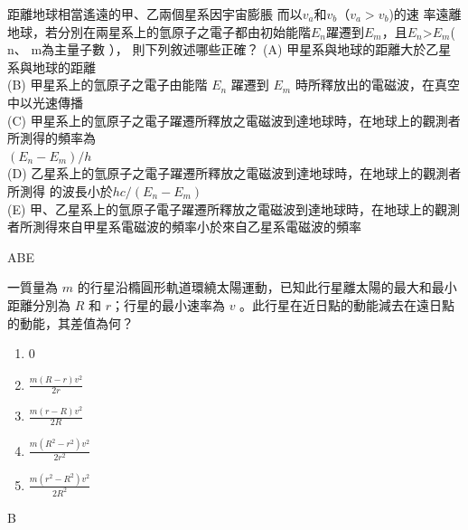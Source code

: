 \documentclass[cn,10pt,math=newtx,chinesefont=founder]{elegantbook}
\begin{document}
\begin{example}
    距離地球相當遙遠的甲、乙兩個星系因宇宙膨脹 而以$v_{a}$和$v_{b}$（$v_{a}>v_{b}$)的速
    率遠離地球，若分別在兩星系上的氫原子之電子都由初始能階$E_n$躍遷到$E_m$，且$E_n$>$E_m$( n、 m為主量子數 ），
    則下列敘述哪些正確？ 
    (A) 甲星系與地球的距離大於乙星系與地球的距離\\
    (B) 甲星系上的氫原子之電子由能階 $E_n$ 躍遷到 $E_m$ 時所釋放出的電磁波，在真空中以光速傳播\\
    (C) 甲星系上的氫原子之電子躍遷所釋放之電磁波到達地球時，在地球上的觀測者所測得的頻率為\\$(E_n-E_m)/h$\\
    (D) 乙星系上的氫原子之電子躍遷所釋放之電磁波到達地球時，在地球上的觀測者所測得 的波長小於$hc/(E_n-E_m)$\\
    (E) 甲、乙星系上的氫原子電子躍遷所釋放之電磁波到達地球時，在地球上的觀測者所測得來自甲星系電磁波的頻率小於來自乙星系電磁波的頻率\\
    \rightline{[109補考]}
\end{example}
\begin{solution}
    ABE
\end{solution}
\newpage

\begin{example}
    ㆒質量為 $m$ 的行星沿橢圓形軌道環繞太陽運動，已知此行星離太陽的最大和最小距離分別為 $R$ 和 $r$；行星的最小速率為 $v$ 。此行星在近日點的動能減去在遠日點的動能，其差值為何？
    \begin{enumerate}[label=(\Alph*)]
        \item 0
        \item $\frac{m(R-r)v^2}{2r}$
        \item $\frac{m(r-R)v^2}{2R}$
        \item $\frac{m(R^2-r^2)v^2}{2r^2}$
        \item $\frac{m(r^2-R^2)v^2}{2R^2}$
    \end{enumerate}
    \rightline{[92指考]}
\end{example}
\begin{solution}
    B
\end{solution}
\newpage
\end{document}
